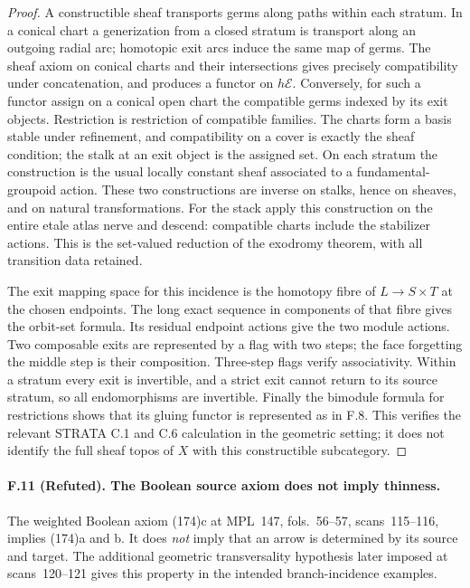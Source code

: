 \begin{proof}
A constructible sheaf transports germs along paths within each stratum.
In a conical chart a generization from a closed stratum is transport along
an outgoing radial arc; homotopic exit arcs induce the same map of germs.
The sheaf axiom on conical charts and their intersections gives precisely
compatibility under concatenation, and produces a functor on
$h\mathcal E$. Conversely, for such a functor assign on a conical open
chart the compatible germs indexed by its exit objects. Restriction is
restriction of compatible families. The charts form a basis stable under
refinement, and compatibility on a cover is exactly the sheaf condition;
the stalk at an exit object is the assigned set. On each stratum the
construction is the usual locally constant sheaf associated to a
fundamental-groupoid action. These two constructions are inverse on
stalks, hence on sheaves, and on natural transformations. For the stack
apply this construction on the entire etale atlas nerve and descend:
compatible charts include the stabilizer actions. This is the
set-valued reduction of the exodromy theorem, with all transition data
retained.

The exit mapping space for this incidence is the homotopy fibre of
$L\to S\times T$ at the chosen endpoints. The long exact sequence in
components of that fibre gives the orbit-set formula. Its residual
endpoint actions give the two module actions. Two composable exits are
represented by a flag with two steps; the face forgetting the middle
step is their composition. Three-step flags verify associativity. Within
a stratum every exit is invertible, and a strict exit cannot return to its
source stratum, so all endomorphisms are invertible. Finally the bimodule
formula for restrictions shows that its gluing functor is represented as
in F.8. This verifies the relevant STRATA C.1 and C.6 calculation in the
geometric setting; it does not identify the full sheaf topos of $X$ with
this constructible subcategory.
\end{proof}

\paragraph{F.11 (Refuted). The Boolean source axiom does not imply thinness.}
The weighted Boolean axiom (174)c at MPL~147, fols.~56--57,
scans~115--116, implies (174)a and b. It does \emph{not} imply that an
arrow is determined by its source and target. The additional geometric
transversality hypothesis later imposed at scans~120--121 gives this
property in the intended branch-incidence examples.

